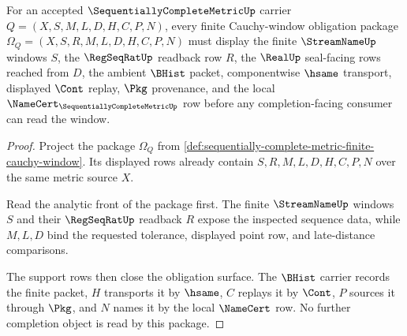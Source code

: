 \begin{theorem}
\label{thm:sequentially-complete-metric-cauchy-window-obligation}
For an accepted $\SequentiallyCompleteMetricUp$ carrier $Q=(X,S,M,L,D,H,C,P,N)$, every finite Cauchy-window obligation package $\Omega_Q=(X,S,R,M,L,D,H,C,P,N)$ must display the finite $\StreamNameUp$ windows $S$, the $\RegSeqRatUp$ readback row $R$, the $\RealUp$ seal-facing rows reached from $D$, the ambient $\BHist$ packet, componentwise $\hsame$ transport, displayed $\Cont$ replay, $\Pkg$ provenance, and the local $\NameCert_{\SequentiallyCompleteMetricUp}$ row before any completion-facing consumer can read the window.
\end{theorem}
\begin{proof}
Project the package $\Omega_Q$ from \autoref{def:sequentially-complete-metric-finite-cauchy-window}. Its displayed rows already contain $S,R,M,L,D,H,C,P,N$ over the same metric source $X$.

Read the analytic front of the package first. The finite $\StreamNameUp$ windows $S$ and their $\RegSeqRatUp$ readback $R$ expose the inspected sequence data, while $M,L,D$ bind the requested tolerance, displayed point row, and late-distance comparisons.

The support rows then close the obligation surface. The $\BHist$ carrier records the finite packet, $H$ transports it by $\hsame$, $C$ replays it by $\Cont$, $P$ sources it through $\Pkg$, and $N$ names it by the local $\NameCert$ row. No further completion object is read by this package.
\end{proof}

